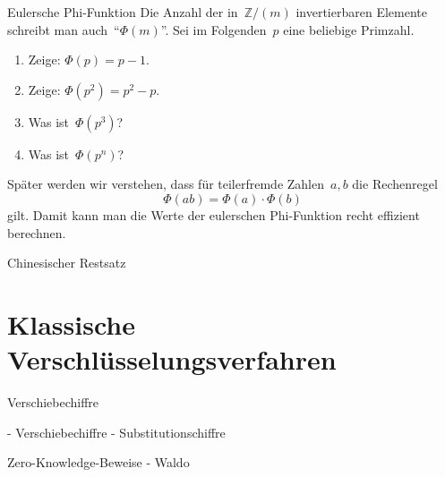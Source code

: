 \documentclass{zirkelblatt}
\newcommand{\head}[1]{\section*{\rmfamily #1}}%
\newcommand{\ZZ}{\mathbb{Z}}
\begin{document}
\begin{aufgabe}{Eulersche Phi-Funktion}
Die Anzahl der in~$\ZZ/(m)$ invertierbaren Elemente schreibt man
auch~"`$\Phi(m)$"'. Sei im Folgenden~$p$ eine beliebige Primzahl.
\begin{enumerate}
\item Zeige: $\Phi(p) = p - 1$.
\item Zeige: $\Phi(p^2) = p^2 - p$.
\item Was ist~$\Phi(p^3)$?
\item Was ist~$\Phi(p^n)$?
\end{enumerate}
Später werden wir verstehen, dass für teilerfremde Zahlen~$a,b$ die Rechenregel
\[ \Phi(ab) = \Phi(a) \cdot \Phi(b) \]
gilt. Damit kann man die Werte der eulerschen Phi-Funktion recht effizient
berechnen.
\end{aufgabe}

\begin{aufgabe}{Chinesischer Restsatz}

\end{aufgabe}

\head{Klassische Verschlüsselungsverfahren}

\begin{aufgabe}{Verschiebechiffre}

\end{aufgabe}

- Verschiebechiffre
- Substitutionschiffre

Zero-Knowledge-Beweise
- Waldo
\end{document}
